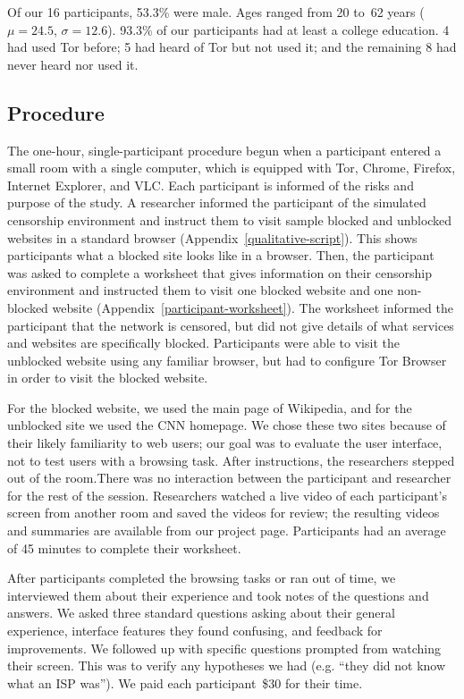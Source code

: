 \documentclass[USenglish,oneside,twocolumn]{article}
\begin{document}
Of our 16 participants, 53.3\% were male. 
Ages ranged from 20 to~62 years
($\mu = 24.5$, $\sigma = 12.6$). 
93.3\% of our participants had at least
a college education.
4 had used Tor before;
5 had heard of Tor but not used it;
and the remaining 8 had never heard nor used it.


\subsection{Procedure}
The one-hour, single-participant procedure begun when a participant entered a small 
room with a single computer, which is equipped with Tor, Chrome, Firefox, Internet Explorer, and VLC.
Each participant is informed of the risks and purpose of the study.
A researcher informed the participant of the simulated censorship environment and
instruct them to visit sample blocked and unblocked websites
in a standard browser (Appendix~\ref{qualitative-script}). 
This shows participants what a blocked site looks like in a browser. 
Then, the participant was asked to complete a worksheet that gives information
on their censorship environment and instructed them
to visit one blocked website and one non-blocked website (Appendix~\ref{participant-worksheet}).
The worksheet informed the participant that the network is censored,
but did not give details of what services and websites are specifically blocked.
Participants were able to visit the unblocked website using any familiar browser,
but had to configure Tor Browser in order to visit the blocked website.
 
For the blocked website, we used the main page of Wikipedia,
and for the unblocked site we used the CNN homepage.
We chose these two sites because of their likely familiarity to web users;
our goal was to evaluate the user interface, not to test users with a browsing task.
After instructions, the researchers stepped out of the room.There was no interaction
between the participant and researcher for the rest of the session.
Researchers watched a live video of each participant's screen from another room
and saved the videos for review; the resulting videos and summaries
are available from our project page.
Participants had an average of 45 minutes to complete their worksheet. 

After participants completed the browsing tasks or ran out of time,
we interviewed them about their experience and
took notes of the questions and answers.
We asked three standard questions asking about their general experience, 
interface features they found confusing, and feedback for improvements. We followed up
with specific questions prompted from watching their screen. 
This was to verify any hypotheses we had (e.g. ``they did not know what an ISP was'').
We paid each participant~\$30 for their time. 
\end{document}
